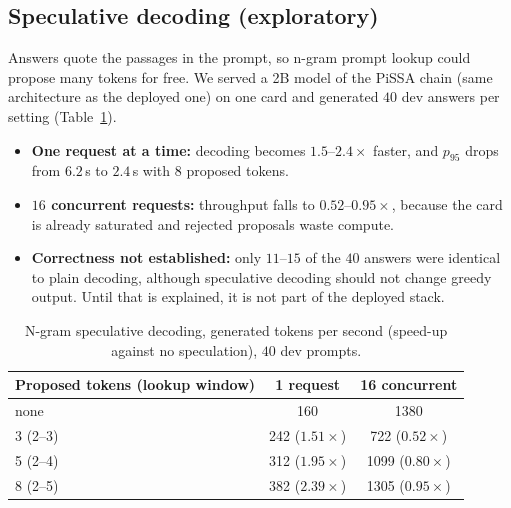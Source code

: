 \documentclass[11pt,a4paper]{article}
\begin{document}
\subsection{Speculative decoding (exploratory)}\label{sec:spec}
Answers quote the passages in the prompt, so n-gram prompt lookup \cite{vllm} could propose many tokens for free. We served a 2B model of the PiSSA chain (same architecture as the deployed one) on one card and generated $40$ dev answers per setting (Table~\ref{tab:spec}).
\begin{itemize}[leftmargin=*]
\item \textbf{One request at a time:} decoding becomes $1.5$--$2.4\times$ faster, and $p_{95}$ drops from $6.2$\,s to $2.4$\,s with $8$ proposed tokens.
\item \textbf{$16$ concurrent requests:} throughput falls to $0.52$--$0.95\times$, because the card is already saturated and rejected proposals waste compute.
\item \textbf{Correctness not established:} only $11$--$15$ of the $40$ answers were identical to plain decoding, although speculative decoding should not change greedy output. Until that is explained, it is not part of the deployed stack.
\end{itemize}
\begin{table}[H]
\centering
\caption{N-gram speculative decoding, generated tokens per second (speed-up against no speculation), $40$ dev prompts.}\label{tab:spec}
\small
\begin{tabular}{@{}lcc@{}}
\toprule
Proposed tokens (lookup window) & 1 request & 16 concurrent\\
\midrule
none & 160 & 1380\\
3 (2--3) & 242 ($1.51\times$) & 722 ($0.52\times$)\\
5 (2--4) & 312 ($1.95\times$) & 1099 ($0.80\times$)\\
8 (2--5) & 382 ($2.39\times$) & 1305 ($0.95\times$)\\
\bottomrule
\end{tabular}
\end{table}

\end{document}
